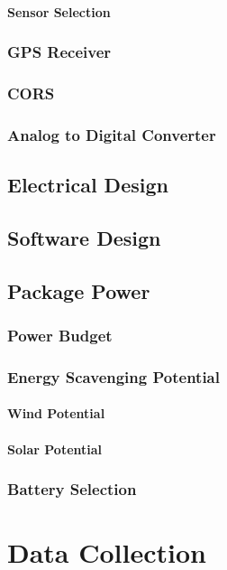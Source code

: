 \documentclass[12pt]{report}
\begin{document}
			\subsubsection{Sensor Selection}
		\subsection{GPS Receiver}
			
		\subsection{CORS}
		\subsection{Analog to Digital Converter}
			
	\section{Electrical Design}
			
	\section{Software Design}
		
	\section{Package Power}
		\subsection{Power Budget}
		\subsection{Energy Scavenging Potential}
			\subsubsection{Wind Potential}
			\subsubsection{Solar Potential}
		\subsection{Battery Selection}
		
\chapter{Data Collection}
\label{ch:DataCollection}
\end{document}
